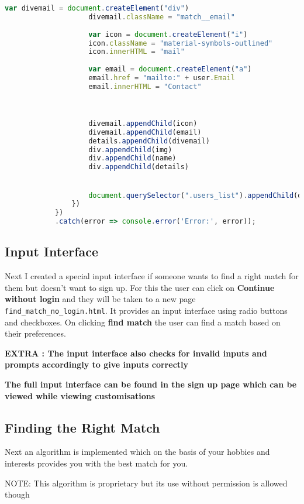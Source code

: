 \documentclass{article}
\begin{document}
\begin{lstlisting}[language=javascript]
                    var divemail = document.createElement("div")
                    divemail.className = "match__email"
                    
                    var icon = document.createElement("i")
                    icon.className = "material-symbols-outlined"
                    icon.innerHTML = "mail"
                    
                    var email = document.createElement("a")
                    email.href = "mailto:" + user.Email
                    email.innerHTML = "Contact"

                    

                    divemail.appendChild(icon)
                    divemail.appendChild(email)
                    details.appendChild(divemail)
                    div.appendChild(img)
                    div.appendChild(name)
                    div.appendChild(details)


                    document.querySelector(".users_list").appendChild(div)
                })
            })
            .catch(error => console.error('Error:', error));

\end{lstlisting}
\subsection{Input Interface}
Next I created a special input interface if someone wants to find a right match for them but doesn't want to sign up. For this the user can click on \textbf{Continue without login} and they will be taken to a new page \texttt{find\_match\_no\_login.html}. It provides an input interface using radio buttons and checkboxes. On clicking \textbf{find match} the user can find a match based on their preferences.

\textbf{EXTRA : The input interface also checks for invalid inputs and prompts accordingly to give inputs correctly}

\textbf{The full input interface can be found in the sign up page which can be viewed while viewing customisations}
\subsection{Finding the Right Match}
Next an algorithm is implemented which on the basis of your hobbies and interests provides you with the best match for you.

NOTE: This algorithm is proprietary but its use without permission is allowed though
\end{document}
